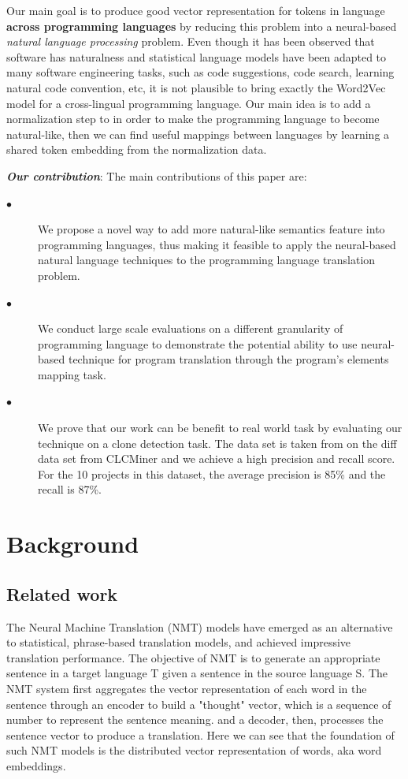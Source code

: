 Our main goal is to produce good vector representation for tokens in language \textbf{across programming languages} by reducing this problem into a neural-based \textit{natural language processing} problem. Even though it has been observed that software has naturalness \cite{hindle2012naturalness} and statistical language models have been adapted to many software engineering tasks, such as code suggestions, code search, learning natural code convention, etc, it is not plausible to bring exactly the Word2Vec model for a cross-lingual programming language.  Our main idea is to add a normalization step to in order to make the programming language to become natural-like, then we can find useful mappings between languages by learning a shared token embedding from the normalization data.

\textbf{\textit{Our contribution}}: The main contributions of this paper are:
\begin{description}
	\item [$\bullet$] We propose a novel way to add more natural-like semantics feature into programming languages, thus making it feasible to apply the neural-based natural language techniques to the programming language translation problem.
	\item [$\bullet$] We conduct large scale evaluations on a different granularity of programming language to demonstrate the potential ability to use neural-based technique for program translation through the program's elements mapping task.
	\item [$\bullet$] We prove that our work can be benefit to real world task by  evaluating our technique on a clone detection task. The data set is taken from on the diff data set from CLCMiner \cite{cheng2017clcminer} and we achieve a high precision and recall score. For the 10 projects in this dataset, the average precision is 85\% and the recall is 87\%.
\end{description}
\section{Background}

\subsection{Related work}
The Neural Machine Translation (NMT) models have emerged as an alternative to statistical, phrase-based translation models, and achieved impressive translation performance. The objective of NMT is to generate an appropriate sentence in a target language T given a sentence in the source language S. The NMT system first aggregates the vector representation of each word in the sentence through an encoder to build a "thought" vector, which is a sequence of number to represent the sentence meaning. and a decoder, then, processes the sentence vector to produce a translation. Here we can see that the foundation of such NMT models is the distributed vector representation of words, aka word embeddings.

